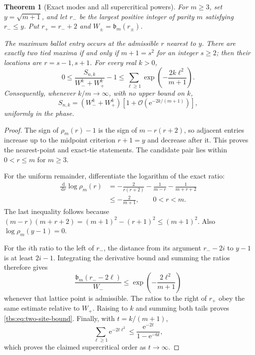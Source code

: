 \documentclass[11pt,a4paper]{article}
\numberwithin{equation}{section}
\newtheorem{theorem}{Theorem}[section]
\theoremstyle{definition}
\newcommand{\bcont}{\mathfrak b}
\newcommand{\dd}{\,\mathrm d}
\newcommand{\ee}{\mathrm e}
\newcommand{\OO}{\mathcal O}
\begin{document}
\begin{theorem}[Exact modes and all supercritical powers]\label{tbs:thm:two-sites}
For $m\ge3$, set $y=\sqrt{m+1}$, and let $r_-$ be the largest positive
integer of parity $m$ satisfying $r_-\le y$. Put $r_+=r_-+2$ and
$W_\pm=\bcont_m(r_\pm)$.

The maximum ballot entry occurs at the admissible $r$ nearest to $y$.
There are exactly two tied maxima if and only if $m+1=s^2$ for an integer
$s\ge2$; then their locations are $r=s-1,s+1$.
For every real $k>0$,
\begin{equation}\label{tbs:eq:two-site-bound}
 0\le\frac{S_{n,k}}{W_-^k+W_+^k}-1
 \le\sum_{\ell\ge1}\exp\!\left(-\frac{2k\ell^2}{m+1}\right).
\end{equation}
Consequently, whenever $k/m\to\infty$, with \emph{no upper bound} on $k$,
\begin{equation}\label{tbs:eq:supercritical-exact}
 S_{n,k}=(W_-^k+W_+^k)
 \left[1+\OO\!\left(\ee^{-2k/(m+1)}\right)\right],
\end{equation}
uniformly in the phase.
\end{theorem}
\begin{proof}
The sign of $\rho_m(r)-1$ is the sign of $m-r(r+2)$, so adjacent
entries increase up to the midpoint criterion $r+1=y$ and decrease
after it. This proves the nearest-point and exact-tie statements.
The candidate pair lies within $0<r\le m$ for $m\ge3$.

For the uniform remainder, differentiate the logarithm of the exact
ratio:
\begin{align*}
 \frac{\dd}{\dd r}\log\rho_m(r)
 &=-\frac{2}{r(r+2)}-\frac1{m-r}-\frac1{m+r+2}\\
 &\le-\frac{2}{m+1},\qquad 0<r<m.
\end{align*}
The last inequality follows because
$(m-r)(m+r+2)=(m+1)^2-(r+1)^2\le(m+1)^2$.
Also $\log\rho_m(y-1)=0$.

For the $i$th ratio to the left of $r_-$, the distance from its argument
$r_--2i$ to $y-1$ is at least $2i-1$. Integrating the derivative bound
and summing the ratios therefore gives
\[
 \frac{\bcont_m(r_--2\ell)}{W_-}
 \le\exp\!\left(-\frac{2\ell^2}{m+1}\right)
\]
whenever that lattice point is admissible. The ratios to the right of
$r_+$ obey the same estimate relative to $W_+$. Raising to $k$ and
summing both tails proves \eqref{tbs:eq:two-site-bound}. Finally, with
$t=k/(m+1)$,
\[
 \sum_{\ell\ge1}\ee^{-2t\ell^2}
 \le\frac{\ee^{-2t}}{1-\ee^{-6t}},
\]
which proves the claimed supercritical order as $t\to\infty$.
\end{proof}
\end{document}
